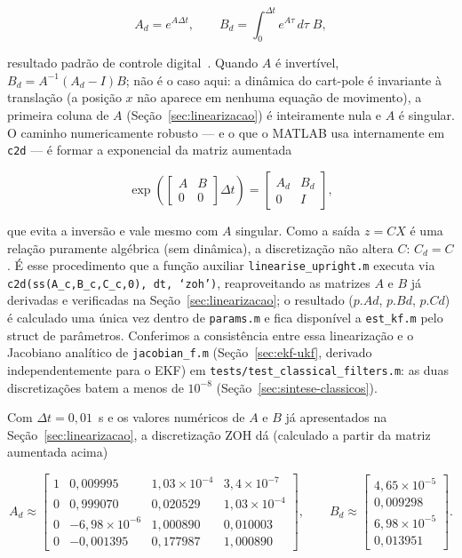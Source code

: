 \documentclass[brazil, 12pt]{article}
\begin{document}
\[
A_d = e^{A\Delta t}, \qquad
B_d = \int_0^{\Delta t} e^{A\tau}\,d\tau\;B,
\]

resultado padrão de controle digital~\cite{simon2006}.
Quando $A$ é invertível, $B_d = A^{-1}(A_d - I)B$; não é o caso aqui: a
dinâmica do cart-pole é invariante à translação (a posição $x$ não aparece em
nenhuma equação de movimento), a primeira coluna de $A$
(Seção~\ref{sec:linearizacao}) é inteiramente nula e $A$ é singular. O caminho
numericamente robusto --- e o que o MATLAB usa internamente em \texttt{c2d} ---
é formar a exponencial da matriz aumentada~\cite{simon2006}

\[
\exp\!\left(
\begin{bmatrix} A & B \\ 0 & 0 \end{bmatrix}\Delta t
\right)
=
\begin{bmatrix} A_d & B_d \\ 0 & I \end{bmatrix},
\]

que evita a inversão e vale mesmo com $A$ singular. Como a saída $z=CX$ é uma
relação puramente algébrica (sem dinâmica), a discretização não altera $C$:
$C_d = C$. É esse procedimento que a função auxiliar
\texttt{linearise\_upright.m} executa via
\texttt{c2d(ss(A\_c,B\_c,C\_c,0), dt, `zoh')}, reaproveitando as matrizes $A$ e
$B$ já derivadas e verificadas na Seção~\ref{sec:linearizacao}; o resultado
($p.Ad$, $p.Bd$, $p.Cd$) é calculado uma única vez dentro de \texttt{params.m}
e fica disponível a \texttt{est\_kf.m} pelo struct de parâmetros. Conferimos a
consistência entre essa linearização e o Jacobiano analítico de
\texttt{jacobian\_f.m} (Seção~\ref{sec:ekf-ukf}, derivado independentemente
para o EKF) em \texttt{tests/test\_classical\_filters.m}: as duas
discretizações batem a menos de $10^{-8}$ (Seção~\ref{sec:sintese-classicos}).

Com $\Delta t = 0{,}01$~s e os valores numéricos de $A$ e $B$ já apresentados
na Seção~\ref{sec:linearizacao}, a discretização ZOH dá (calculado a partir da
matriz aumentada acima)

\[
A_d \approx
\begin{bmatrix}
1 & 0{,}009995 & 1{,}03\times10^{-4} & 3{,}4\times10^{-7} \\
0 & 0{,}999070 & 0{,}020529          & 1{,}03\times10^{-4} \\
0 & -6{,}98\times10^{-6} & 1{,}000890 & 0{,}010003 \\
0 & -0{,}001395 & 0{,}177987          & 1{,}000890
\end{bmatrix},
\qquad
B_d \approx
\begin{bmatrix}
4{,}65\times10^{-5} \\ 0{,}009298 \\ 6{,}98\times10^{-5} \\ 0{,}013951
\end{bmatrix}.
\]
\end{document}
